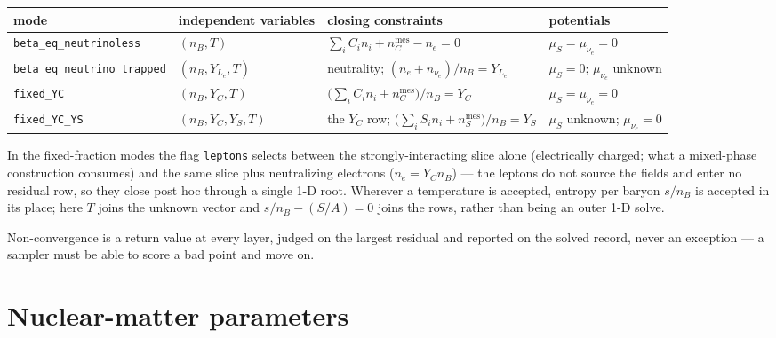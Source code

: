 \documentclass[aps,prc,onecolumn,superscriptaddress,nofootinbib,10pt]{revtex4-2}
\newcommand{\nB}{n_B}
\newcommand{\muS}{\mu_S}
\newcommand{\munue}{\mu_{\nu_e}}
\begin{document}
\begin{center}
\begin{tabular}{llll}
\toprule
mode & independent variables & closing constraints & potentials \\
\midrule
\texttt{beta\_eq\_neutrinoless} & $(\nB, T)$ &
  $\sum_i C_i n_i + n_C^{\mathrm{mes}} - n_e = 0$ &
  $\muS = \munue = 0$ \\
\texttt{beta\_eq\_neutrino\_trapped} & $(\nB, Y_{L_e}, T)$ &
  neutrality; $(n_e + n_{\nu_e})/\nB = Y_{L_e}$ &
  $\muS = 0$; $\munue$ unknown \\
\texttt{fixed\_YC} & $(\nB, Y_C, T)$ &
  $\big(\textstyle\sum_i C_i n_i + n_C^{\mathrm{mes}}\big)/\nB = Y_C$ &
  $\muS = \munue = 0$ \\
\texttt{fixed\_YC\_YS} & $(\nB, Y_C, Y_S, T)$ &
  the $Y_C$ row; $\big(\textstyle\sum_i S_i n_i + n_S^{\mathrm{mes}}\big)/\nB = Y_S$ &
  $\muS$ unknown; $\munue = 0$ \\
\bottomrule
\end{tabular}
\end{center}
%
In the fixed-fraction modes the flag \texttt{leptons} selects between the
strongly-interacting slice alone (electrically charged; what a mixed-phase
construction consumes) and the same slice plus neutralizing electrons
($n_e = Y_C \nB$) --- the leptons do not source the fields and enter no
residual row, so they close post hoc through a single 1-D root. Wherever a
temperature is accepted, entropy per baryon $s/\nB$ is accepted in its place;
here $T$ joins the unknown vector and $s/\nB - (S/A) = 0$ joins the rows,
rather than being an outer 1-D solve.

Non-convergence is a return value at every layer, judged on the largest
residual and reported on the solved record, never an exception --- a sampler
must be able to score a bad point and move on.

\section{Nuclear-matter parameters}
\end{document}

